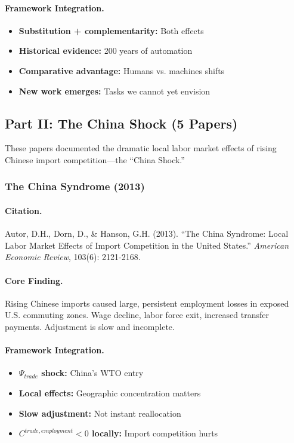 \documentclass[12pt,a4paper]{article}
\begin{document}
\paragraph{Framework Integration.}
\begin{itemize}
  \item \textbf{Substitution + complementarity:} Both effects
  \item \textbf{Historical evidence:} 200 years of automation
  \item \textbf{Comparative advantage:} Humans vs. machines shifts
  \item \textbf{New work emerges:} Tasks we cannot yet envision
\end{itemize}

\subsection{Part II: The China Shock (5 Papers)}

These papers documented the dramatic local labor market effects of rising
Chinese import competition---the ``China Shock.''

\subsubsection{The China Syndrome (2013)}

\paragraph{Citation.}
Autor, D.H., Dorn, D., \& Hanson, G.H. (2013). ``The China Syndrome:
Local Labor Market Effects of Import Competition in the United States.''
\emph{American Economic Review}, 103(6): 2121-2168.

\paragraph{Core Finding.}
Rising Chinese imports caused large, persistent employment losses in
exposed U.S. commuting zones. Wage decline, labor force exit, increased
transfer payments. Adjustment is slow and incomplete.

\paragraph{Framework Integration.}
\begin{itemize}
  \item \textbf{$\Psi_{trade}$ shock:} China's WTO entry
  \item \textbf{Local effects:} Geographic concentration matters
  \item \textbf{Slow adjustment:} Not instant reallocation
  \item \textbf{$C^{trade,employment} < 0$ locally:} Import competition hurts
\end{itemize}
\end{document}
